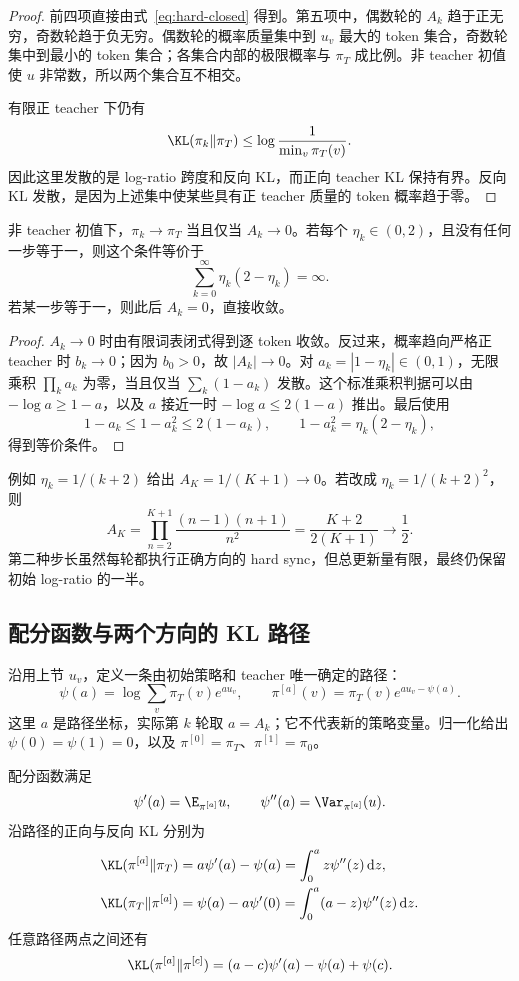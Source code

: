 \begin{proof}
前四项直接由式~\eqref{eq:hard-closed} 得到。第五项中，偶数轮的 $A_k$ 趋于正无穷，奇数轮趋于负无穷。偶数轮的概率质量集中到 $u_v$ 最大的 token 集合，奇数轮集中到最小的 token 集合；各集合内部的极限概率与 $\pi_T$ 成比例。非 teacher 初值使 $u$ 非常数，所以两个集合互不相交。

有限正 teacher 下仍有
\[
 \KL(\pi_k\Vert\pi_T)\leq\log\frac1{\min_v\pi_T(v)}.
\]
因此这里发散的是 log-ratio 跨度和反向 KL，而正向 teacher KL 保持有界。反向 KL 发散，是因为上述集中使某些具有正 teacher 质量的 token 概率趋于零。
\end{proof}

\begin{proposition}[变步长的充要条件]
非 teacher 初值下，$\pi_k\to\pi_T$ 当且仅当 $A_k\to0$。若每个 $\eta_k\in(0,2)$，且没有任何一步等于一，则这个条件等价于
\[
 \sum_{k=0}^{\infty}\eta_k(2-\eta_k)=\infty.
\]
若某一步等于一，则此后 $A_k=0$，直接收敛。
\end{proposition}

\begin{proof}
$A_k\to0$ 时由有限词表闭式得到逐 token 收敛。反过来，概率趋向严格正 teacher 时 $b_k\to0$；因为 $b_0>0$，故 $|A_k|\to0$。对 $a_k=|1-\eta_k|\in(0,1)$，无限乘积 $\prod_k a_k$ 为零，当且仅当 $\sum_k(1-a_k)$ 发散。这个标准乘积判据可以由 $-\log a\geq1-a$，以及 $a$ 接近一时 $-\log a\leq2(1-a)$ 推出。最后使用
\[
 1-a_k\leq1-a_k^2\leq2(1-a_k),
 \qquad 1-a_k^2=\eta_k(2-\eta_k),
\]
得到等价条件。
\end{proof}

例如 $\eta_k=1/(k+2)$ 给出 $A_K=1/(K+1)\to0$。若改成 $\eta_k=1/(k+2)^2$，则
\[
 A_K=\prod_{n=2}^{K+1}\frac{(n-1)(n+1)}{n^2}
 =\frac{K+2}{2(K+1)}\longrightarrow\frac12.
\]
第二种步长虽然每轮都执行正确方向的 hard sync，但总更新量有限，最终仍保留初始 log-ratio 的一半。

\subsection{配分函数与两个方向的 KL 路径}

沿用上节 $u_v$，定义一条由初始策略和 teacher 唯一确定的路径：
\[
 \psi(a)=\log\sum_v\pi_T(v)e^{a u_v},\qquad
 \pi^{[a]}(v)=\pi_T(v)e^{a u_v-\psi(a)}.
\]
这里 $a$ 是路径坐标，实际第 $k$ 轮取 $a=A_k$；它不代表新的策略变量。归一化给出 $\psi(0)=\psi(1)=0$，以及 $\pi^{[0]}=\pi_T$、$\pi^{[1]}=\pi_0$。

\begin{theorem}[KL 路径的精确积分]
\label{thm:hs-kl-path}
配分函数满足
\[
 \psi'(a)=\E_{\pi^{[a]}}u,
 \qquad\psi''(a)=\Var_{\pi^{[a]}}(u).
\]
沿路径的正向与反向 KL 分别为
\begin{align}
 \KL(\pi^{[a]}\Vert\pi_T)
 &=a\psi'(a)-\psi(a)
 =\int_0^a z\psi''(z)\,\mathrm dz,
 \label{eq:hs-forward-kl-path}\\
 \KL(\pi_T\Vert\pi^{[a]})
 &=\psi(a)-a\psi'(0)
 =\int_0^a(a-z)\psi''(z)\,\mathrm dz.
 \label{eq:hs-reverse-kl-path}
\end{align}
任意路径两点之间还有
\[
 \KL(\pi^{[a]}\Vert\pi^{[c]})
 =(a-c)\psi'(a)-\psi(a)+\psi(c).
\]
\end{theorem}

